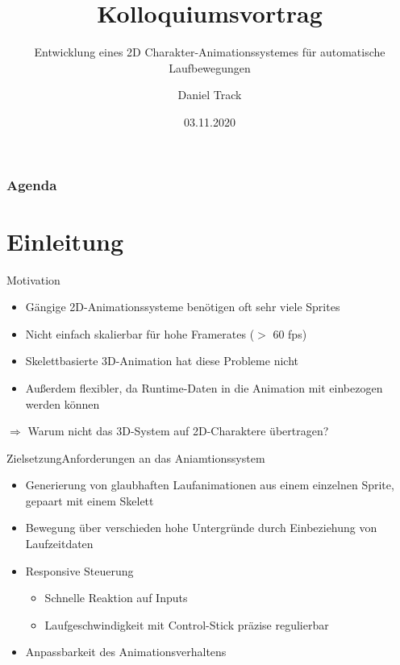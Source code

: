 \documentclass[t,aspectratio=169,divpsnames]{beamer}
\title{Kolloquiumsvortrag}
\subtitle{Entwicklung eines 2D Charakter-Animationssystemes für automatische Laufbewegungen}
\author{Daniel Track}
\institute{Hochschule Trier}
\date{03.11.2020}
\begin{document}
\begin{frame}
    \titlepage
\end{frame}

\begin{frame}
    \frametitle{Agenda}
    \tableofcontents
\end{frame}

\section{Einleitung}

\begin{frame}{Motivation}
    \begin{itemize}
        \item Gängige 2D-Animationssysteme benötigen oft sehr viele Sprites %
        \item Nicht einfach skalierbar für hohe Framerates ($>$ 60 fps)
        \item Skelettbasierte 3D-Animation hat diese Probleme nicht
        \item Außerdem flexibler, da Runtime-Daten in die Animation mit einbezogen werden können
    \end{itemize}

    $\Rightarrow$ Warum nicht das 3D-System auf 2D-Charaktere übertragen?
\end{frame}

\begin{frame}{Zielsetzung}{Anforderungen an das Aniamtionssystem}
    \begin{itemize}
        \item Generierung von glaubhaften Laufanimationen aus einem einzelnen Sprite, gepaart mit einem Skelett
        \item Bewegung über verschieden hohe Untergründe durch Einbeziehung von Laufzeitdaten
        \item Responsive Steuerung
              \begin{itemize}
                  \item Schnelle Reaktion auf Inputs
                  \item Laufgeschwindigkeit mit Control-Stick präzise regulierbar
              \end{itemize}
        \item Anpassbarkeit des Animationsverhaltens
    \end{itemize}
\end{frame}
\end{document}
